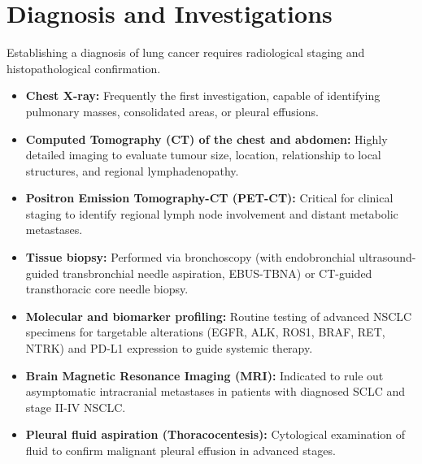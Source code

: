 \section*{Diagnosis and Investigations}
Establishing a diagnosis of lung cancer requires radiological staging and histopathological confirmation.
\begin{itemize}
    \item \textbf{Chest X-ray:} Frequently the first investigation, capable of identifying pulmonary masses, consolidated areas, or pleural effusions.
    \item \textbf{Computed Tomography (CT) of the chest and abdomen:} Highly detailed imaging to evaluate tumour size, location, relationship to local structures, and regional lymphadenopathy.
    \item \textbf{Positron Emission Tomography-CT (PET-CT):} Critical for clinical staging to identify regional lymph node involvement and distant metabolic metastases.
    \item \textbf{Tissue biopsy:} Performed via bronchoscopy (with endobronchial ultrasound-guided transbronchial needle aspiration, EBUS-TBNA) or CT-guided transthoracic core needle biopsy.
    \item \textbf{Molecular and biomarker profiling:} Routine testing of advanced NSCLC specimens for targetable alterations (EGFR, ALK, ROS1, BRAF, RET, NTRK) and PD-L1 expression to guide systemic therapy.
    \item \textbf{Brain Magnetic Resonance Imaging (MRI):} Indicated to rule out asymptomatic intracranial metastases in patients with diagnosed SCLC and stage II-IV NSCLC.
    \item \textbf{Pleural fluid aspiration (Thoracocentesis):} Cytological examination of fluid to confirm malignant pleural effusion in advanced stages.
\end{itemize}

